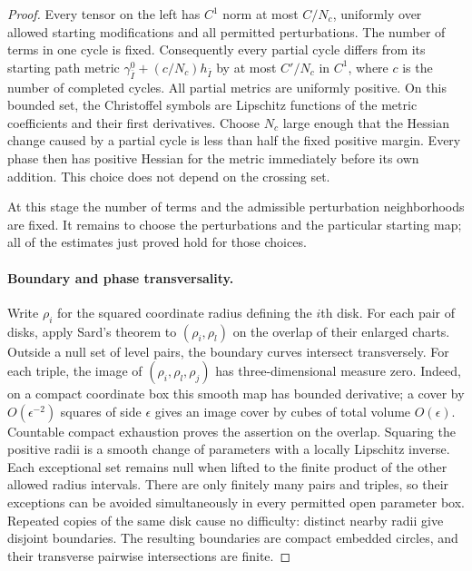 \begin{proof}
Every tensor on the left has $C^1$ norm at most $C/N_c$, uniformly over
allowed starting modifications and all permitted perturbations.  The
number of terms in one cycle is fixed.  Consequently every partial cycle
differs from its starting path metric
$\gamma^0_{\bar I}+(c/N_c)h_{\bar I}$ by at most $C'/N_c$ in $C^1$, where
$c$ is the number of completed cycles.  All partial metrics are uniformly
positive.  On this bounded set, the Christoffel symbols are Lipschitz
functions of the metric coefficients and their first derivatives.
Choose $N_c$ large enough that the Hessian change caused by a partial cycle
is less than half the fixed positive margin.  Every phase then has positive
Hessian for the metric immediately before its own addition.  This choice
does not depend on the crossing set.

At this stage the number of terms and the admissible perturbation
neighborhoods are fixed.  It remains to choose the perturbations and the
particular starting map; all of the estimates just proved hold for those
choices.

\paragraph{Boundary and phase transversality.}
Write $\rho_i$ for the squared coordinate radius defining the $i$th disk.
For each pair of disks, apply Sard's theorem
\cite[Theorem~4.1, p.~885]{Sard1942} to $(\rho_i,\rho_l)$ on the overlap of
their enlarged charts.  Outside a null set of level pairs, the boundary
curves intersect transversely.  For each triple, the image of
$(\rho_i,\rho_l,\rho_j)$ has three-dimensional measure zero.
Indeed, on a compact coordinate box this smooth map has bounded
derivative; a cover by $O(\epsilon^{-2})$ squares of side $\epsilon$
gives an image cover by cubes of total volume $O(\epsilon)$.
Countable compact exhaustion proves the assertion on the overlap.
Squaring the positive radii is a smooth change of parameters with a
locally Lipschitz inverse.  Each exceptional set remains null when
lifted to the finite product of the other allowed radius intervals.
There are only finitely many pairs and triples, so their exceptions
can be avoided simultaneously in every permitted open parameter box.
Repeated copies of the same disk cause no difficulty: distinct nearby
radii give disjoint boundaries.  The resulting boundaries are compact
embedded circles, and their transverse pairwise intersections are finite.


\end{proof}
